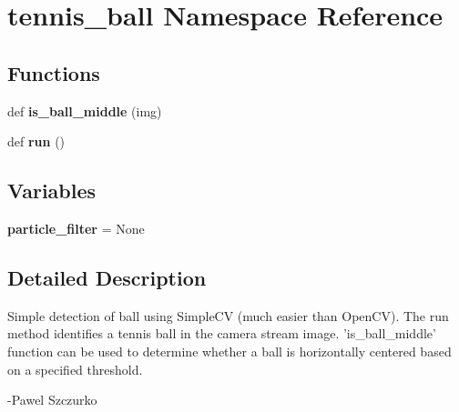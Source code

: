 \hypertarget{namespacetennis__ball}{}\section{tennis\+\_\+ball Namespace Reference}
\label{namespacetennis__ball}
\subsection*{Functions}
\begin{DoxyCompactItemize}
\item 
\hypertarget{namespacetennis__ball_a595850f165f1ae2c78218d580854bfda}{}def {\bfseries is\+\_\+ball\+\_\+middle} (img)\label{namespacetennis__ball_a595850f165f1ae2c78218d580854bfda}

\item 
\hypertarget{namespacetennis__ball_af2aced0030d28f7b0b98175dd3a3d97c}{}def {\bfseries run} ()\label{namespacetennis__ball_af2aced0030d28f7b0b98175dd3a3d97c}

\end{DoxyCompactItemize}
\subsection*{Variables}
\begin{DoxyCompactItemize}
\item 
\hypertarget{namespacetennis__ball_aba3913b89ed8c5fae700b6dfbca98f05}{}{\bfseries particle\+\_\+filter} = None\label{namespacetennis__ball_aba3913b89ed8c5fae700b6dfbca98f05}

\end{DoxyCompactItemize}


\subsection{Detailed Description}
\begin{DoxyVerb}Simple detection of ball using SimpleCV (much easier than OpenCV). The run method
identifies a tennis ball in the camera stream image. 'is_ball_middle' function
can be used to determine whether a ball is horizontally centered based on a specified
threshold.

-Pawel Szczurko
\end{DoxyVerb}
 